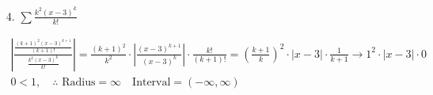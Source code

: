 \begin{itemize}
        \item[4.] $\sum\frac{k^{2}(x-3)^{k}}{k!}$
        \\
        \begin{mdframed}
            \begin{equation*}
                \begin{gathered}
                    \left|\frac {\frac{(k+1)^{2}(x-3)^{k+1}}{(k+1)!}}
                                {\frac{k^{2}(x-3)^{k}}{k!}}\right| =
                            \frac{(k+1)^{2}}{k^{2}}\cdot
                            \left|\frac{(x-3)^{k+1}}{(x-3)^{k}}\right|\cdot
                            \frac{k!}{(k+1)!} =
                            \left(\frac{k+1}{k}\right)^{2}\cdot
                            |x-3|\cdot
                            \frac{1}{k+1} \rightarrow
                            1^{2} \cdot |x-3| \cdot 0   \\
                            0 < 1, \quad 
                            \therefore \text{ Radius} = \infty \quad
                            \text{Interval} = \left(-\infty, \infty\right)
                \end{gathered}
            \end{equation*}
        \end{mdframed}
    \end{itemize}
